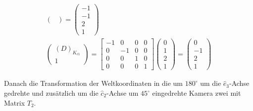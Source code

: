 \begin{gather}
\begin{pmatrix}
	\end{pmatrix}
	=
	\begin{pmatrix}
		-1\\-1\\2\\1
	\end{pmatrix}\\
	\begin{pmatrix}
		(D)_{K_{c1}}\\1
	\end{pmatrix}
	=
	\begin{bmatrix}
		-1&0&0&0\\
		0&-1&0&0\\
		0&0&1&0\\
		0&0&0&1
	\end{bmatrix}
	\begin{pmatrix}
		0\\1\\2\\1
	\end{pmatrix}
	=
	\begin{pmatrix}
		0\\-1\\2\\1
	\end{pmatrix}
\end{gather}

Danach die Transformation der Weltkoordinaten in die um \ensuremath{180^\circ} um die \ensuremath{\hat{e}_3}-Achse gedrehte und zusätzlich um die \ensuremath{\hat{c}_2}-Achse um \ensuremath{45^\circ} eingedrehte Kamera zwei mit Matrix \ensuremath{T_2}.

